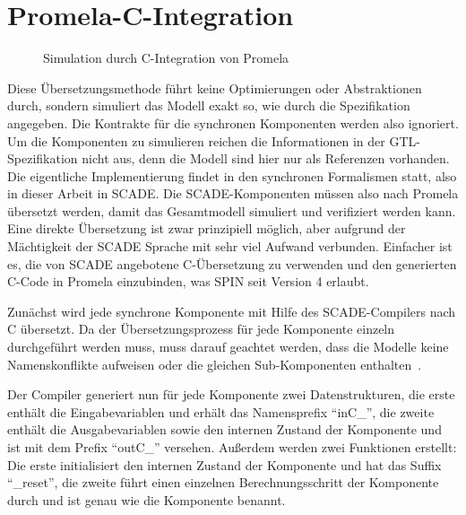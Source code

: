 \section{Promela-C-Integration}
\label{sec:c_integration}
\begin{figure}
  \centering
  \caption{Simulation durch C-Integration von Promela}
\end{figure}

Diese Übersetzungsmethode führt keine Optimierungen oder Abstraktionen durch, sondern simuliert das Modell exakt so, wie durch die Spezifikation angegeben.
Die Kontrakte für die synchronen Komponenten werden also ignoriert.
Um die Komponenten zu simulieren reichen die Informationen in der GTL-Spezifikation nicht aus, denn die Modell sind hier nur als Referenzen vorhanden.
Die eigentliche Implementierung findet in den synchronen Formalismen statt, also in dieser Arbeit in SCADE.
Die SCADE-Komponenten müssen also nach Promela übersetzt werden, damit das Gesamtmodell simuliert und verifiziert werden kann.
Eine direkte Übersetzung ist zwar prinzipiell möglich, aber aufgrund der Mächtigkeit der SCADE Sprache mit sehr viel Aufwand verbunden.
Einfacher ist es, die von SCADE angebotene C-Übersetzung zu verwenden und den generierten C-Code in Promela einzubinden, was SPIN seit Version 4 erlaubt.

Zunächst wird jede synchrone Komponente mit Hilfe des SCADE-Compilers nach C übersetzt.
Da der Übersetzungsprozess für jede Komponente einzeln durchgeführt werden muss, muss darauf geachtet werden, dass die Modelle keine Namenskonflikte aufweisen oder die gleichen Sub-Komponenten enthalten~\cite{scade_c_integration}.

Der Compiler generiert nun für jede Komponente zwei Datenstrukturen, die erste enthält die Eingabevariablen und erhält das Namensprefix "`inC\_"', die zweite enthält die Ausgabevariablen sowie den internen Zustand der Komponente und ist mit dem Prefix "`outC\_"' versehen.
Außerdem werden zwei Funktionen erstellt:
Die erste initialisiert den internen Zustand der Komponente und hat das Suffix "`\_reset"', die zweite führt einen einzelnen Berechnungsschritt der Komponente durch und ist genau wie die Komponente benannt.

